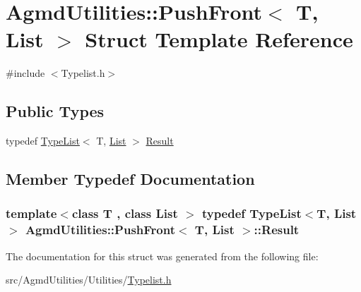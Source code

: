 \hypertarget{struct_agmd_utilities_1_1_push_front}{\section{Agmd\+Utilities\+:\+:Push\+Front$<$ T, List $>$ Struct Template Reference}
\label{struct_agmd_utilities_1_1_push_front}
}


{\ttfamily \#include $<$Typelist.\+h$>$}

\subsection*{Public Types}
\begin{DoxyCompactItemize}
\item 
typedef \hyperlink{struct_agmd_utilities_1_1_type_list}{Type\+List}$<$ T, \hyperlink{class_agmd_utilities_1_1_list}{List} $>$ \hyperlink{struct_agmd_utilities_1_1_push_front_aae9b0c51655559aae0cd6df055c82724}{Result}
\end{DoxyCompactItemize}


\subsection{Member Typedef Documentation}
\hypertarget{struct_agmd_utilities_1_1_push_front_aae9b0c51655559aae0cd6df055c82724}{
\subsubsection[{Result}]{\setlength{\rightskip}{0pt plus 5cm}template$<$class T , class List $>$ typedef {\bf Type\+List}$<$T, {\bf List}$>$ {\bf Agmd\+Utilities\+::\+Push\+Front}$<$ T, {\bf List} $>$\+::{\bf Result}}}\label{struct_agmd_utilities_1_1_push_front_aae9b0c51655559aae0cd6df055c82724}


The documentation for this struct was generated from the following file\+:\begin{DoxyCompactItemize}
\item 
src/\+Agmd\+Utilities/\+Utilities/\hyperlink{_typelist_8h}{Typelist.\+h}\end{DoxyCompactItemize}

